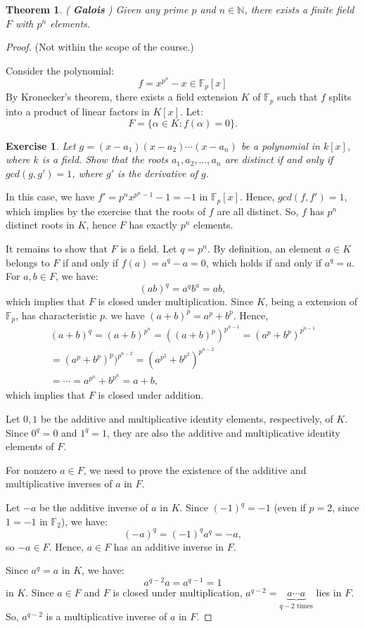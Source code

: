 \documentclass[a4paper,12pt]{report}
\newcounter{statement}
\numberwithin{statement}{chapter}
\newtheorem{thm}[statement]{Theorem}
\newtheorem{ex}[statement]{\bf Exercise}
\numberwithin{equation}{chapter}
\numberwithin{section}{chapter}
\numberwithin{subsection}{section}
\begin{document}
\begin{thm}
( {\bf Galois} )
Given any prime $p$ and $n \in \mathbb{N}$,
there exists a finite field $F$ with $p^n$ elements.
\end{thm}
\begin{proof}
(Not within the scope of the course.)


Consider the polynomial:
\[
f = x^{p^n} - x \in \mathbb{F}_p[x]
\]
By Kronecker's theorem, there exists a field extension $K$ of $\mathbb{F}_p$
such that $f$ splits into a product of linear factors in $K[x]$.
Let:
\[
F = \{\alpha \in K : f(\alpha) = 0\}.
\]



\begin{ex}
Let $g = (x - a_1)(x - a_2)\cdots(x - a_n)$ be a polynomial in $k[x]$,
where $k$ is a field.  Show that the roots $a_1, a_2, \ldots, a_n$ are distinct
if and only if $gcd(g, g') = 1$, where $g'$ is the derivative of $g$.
\end{ex}

In this case, we have $f' = p^n x^{p^n - 1} - 1 = -1$ in $\mathbb{F}_p[x]$.
Hence, $gcd(f, f') = 1$, which implies by the exercise that the roots of $f$
are all distinct.  So, $f$ has $p^n$ distinct roots in $K$, hence $F$ has exactly $p^n$ elements.

It remains to show that $F$ is a field.
Let $q = p^n$.  By definition, an element $a \in K$ belongs to $F$ if and only if
$f(a) = a^q - a = 0$, which holds if and only if $a^q = a$.
For $a, b \in F$, we have:
\[
(ab)^q = a^qb^a = ab,
\]
which implies that $F$ is closed under multiplication.
Since $K$, being a extension of $\mathbb{F}_p$, has characteristic $p$.
we have $(a + b)^p = a^p + b^p$.  Hence,
\begin{multline*}
(a + b)^q = (a + b)^{p^n} = ((a + b)^p)^{p^{n - 1}} = (a^p  + b^p)^{p^{n - 1}}\\
= (a^p + b^p)^p)^{p^{n - 2}} = (a^{p^2} + b^{p^2})^{p^{n - 2}}\\
 = \cdots = a^{p^n} + b^{p^n} = a + b,
\end{multline*}
which implies that  $F$ is closed under addition.

Let $0, 1$ be the additive and multiplicative identity elements, respectively, of $K$.
Since $0^q = 0$ and $1^q = 1$, they are also the additive and multiplicative identity elements of $F$.

For nonzero $a \in F$, we need to prove the existence of
the additive and multiplicative inverses of $a$ in $F$.

Let $-a$ be the additive inverse of $a$ in $K$.
Since $(-1)^q = -1$ (even if $p = 2$, since $1 = -1$ in $\mathbb{F}_2$),
we have:
\[
(-a)^q = (-1)^q a^q = -a,
\]
so $-a \in F$.  Hence, $a \in F$ has an additive inverse in $F$.

Since $a^q = a$ in $K$, we have:
\[
a^{q - 2} a = a^{q - 1} = 1
\]
in $K$.  Since $a \in F$ and $F$ is closed under multiplication,
$a^{q - 2} = \underbrace{a\cdots a}_{q-2 \text{ times}}$ lies in $F$.
So, $a^{q -2}$ is a multiplicative inverse of $a$ in $F$.


\end{proof}
\end{document}
